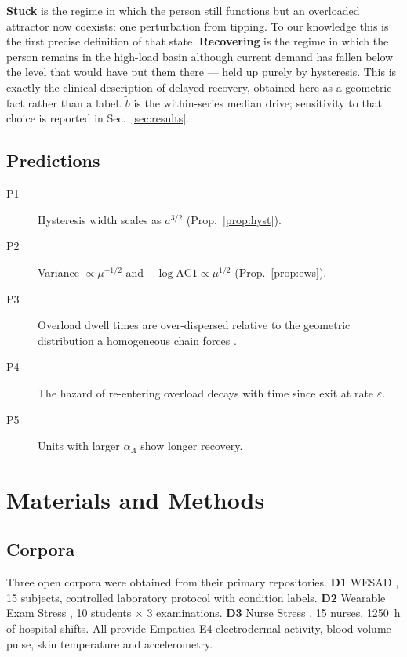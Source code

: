 \documentclass[conference]{IEEEtran}
\begin{document}
\noindent\textbf{Stuck} is the regime in which the person still functions but
an overloaded attractor now coexists: one perturbation from tipping. To our
knowledge this is the first precise definition of that state.
\textbf{Recovering} is the regime in which the person remains in the high-load
basin although current demand has fallen below the level that would have put
them there --- held up purely by hysteresis. This is exactly the clinical
description of delayed recovery, obtained here as a geometric fact rather than
a label. $\tilde b$ is the within-series median drive; sensitivity to that
choice is reported in Sec.~\ref{sec:results}.

\subsection{Predictions}

\begin{description}
\item[P1] Hysteresis width scales as $a^{3/2}$ (Prop.~\ref{prop:hyst}).
\item[P2] Variance $\propto\mu^{-1/2}$ and $-\log\mathrm{AC1}\propto\mu^{1/2}$
  (Prop.~\ref{prop:ews}).
\item[P3] Overload dwell times are over-dispersed relative to the geometric
  distribution a homogeneous chain forces \label{prop:dwell}.
\item[P4] The hazard of re-entering overload decays with time since exit at
  rate $\varepsilon$.
\item[P5] Units with larger $\alpha_A$ show longer recovery.
\end{description}

\section{Materials and Methods}

\subsection{Corpora}
Three open corpora were obtained from their primary repositories. \textbf{D1}
WESAD \cite{schmidt2018wesad}, 15 subjects, controlled laboratory protocol with
condition labels. \textbf{D2} Wearable Exam Stress \cite{amin2022exam}, 10
students $\times$ 3 examinations. \textbf{D3} Nurse Stress
\cite{hosseini2022nurse}, 15 nurses, \SI{1250}{\hour} of hospital shifts. All
provide Empatica E4 electrodermal activity, blood volume pulse, skin
temperature and accelerometry.
\end{document}
